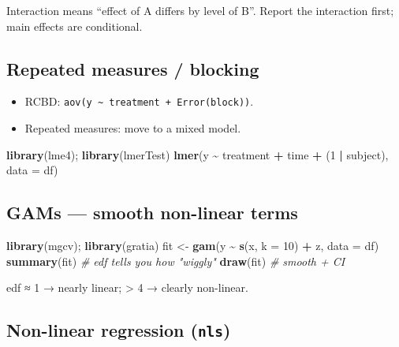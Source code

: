 \documentclass[
]{article}
\newenvironment{Shaded}{\begin{snugshade}}{\end{snugshade}}
\newcommand{\AttributeTok}[1]{\textcolor[rgb]{0.13,0.29,0.53}{#1}}
\newcommand{\CommentTok}[1]{\textcolor[rgb]{0.56,0.35,0.01}{\textit{#1}}}
\newcommand{\DecValTok}[1]{\textcolor[rgb]{0.00,0.00,0.81}{#1}}
\newcommand{\FunctionTok}[1]{\textcolor[rgb]{0.13,0.29,0.53}{\textbf{#1}}}
\newcommand{\NormalTok}[1]{#1}
\newcommand{\OtherTok}[1]{\textcolor[rgb]{0.56,0.35,0.01}{#1}}
\newcommand{\SpecialCharTok}[1]{\textcolor[rgb]{0.81,0.36,0.00}{\textbf{#1}}}
\providecommand{\tightlist}{%
  \setlength{\itemsep}{0pt}\setlength{\parskip}{0pt}}
\begin{document}
Interaction means ``effect of A differs by level of B''. Report the
interaction first; main effects are conditional.

\subsection{Repeated measures /
blocking}\label{repeated-measures-blocking}

\begin{itemize}
\tightlist
\item
  RCBD: \texttt{aov(y\ \textasciitilde{}\ treatment\ +\ Error(block))}.
\item
  Repeated measures: move to a mixed model.
\end{itemize}

\begin{Shaded}
\begin{Highlighting}[]
\FunctionTok{library}\NormalTok{(lme4); }\FunctionTok{library}\NormalTok{(lmerTest)}
\FunctionTok{lmer}\NormalTok{(y }\SpecialCharTok{\textasciitilde{}}\NormalTok{ treatment }\SpecialCharTok{+}\NormalTok{ time }\SpecialCharTok{+}\NormalTok{ (}\DecValTok{1} \SpecialCharTok{|}\NormalTok{ subject), }\AttributeTok{data =}\NormalTok{ df)}
\end{Highlighting}
\end{Shaded}

\subsection{GAMs --- smooth non-linear
terms}\label{gams-smooth-non-linear-terms}

\begin{Shaded}
\begin{Highlighting}[]
\FunctionTok{library}\NormalTok{(mgcv); }\FunctionTok{library}\NormalTok{(gratia)}
\NormalTok{fit }\OtherTok{\textless{}{-}} \FunctionTok{gam}\NormalTok{(y }\SpecialCharTok{\textasciitilde{}} \FunctionTok{s}\NormalTok{(x, }\AttributeTok{k =} \DecValTok{10}\NormalTok{) }\SpecialCharTok{+}\NormalTok{ z, }\AttributeTok{data =}\NormalTok{ df)}
\FunctionTok{summary}\NormalTok{(fit)      }\CommentTok{\# edf tells you how "wiggly"}
\FunctionTok{draw}\NormalTok{(fit)         }\CommentTok{\# smooth + CI}
\end{Highlighting}
\end{Shaded}

edf ≈ 1 → nearly linear; \textgreater{} 4 → clearly non-linear.

\subsection{\texorpdfstring{Non-linear regression
(\texttt{nls})}{Non-linear regression (nls)}}\label{non-linear-regression-nls}
\end{document}
